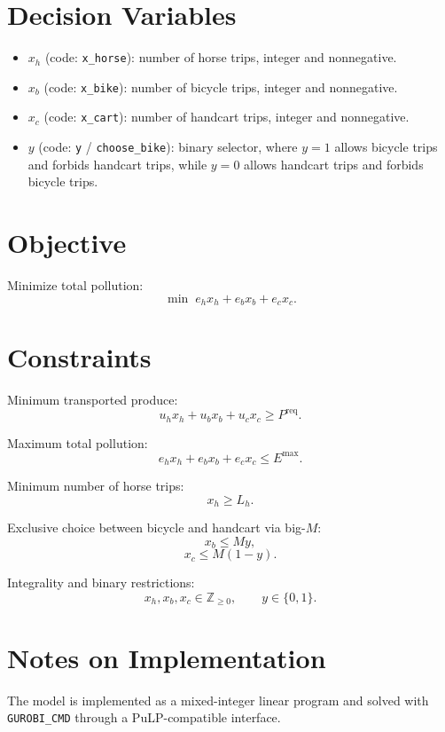 \section*{Decision Variables}

\begin{itemize}
    \item $x_h$ (code: \texttt{x\_horse}): number of horse trips, integer and nonnegative.
    \item $x_b$ (code: \texttt{x\_bike}): number of bicycle trips, integer and nonnegative.
    \item $x_c$ (code: \texttt{x\_cart}): number of handcart trips, integer and nonnegative.
    \item $y$ (code: \texttt{y} / \texttt{choose\_bike}): binary selector, where \(y=1\) allows bicycle trips and forbids handcart trips, while \(y=0\) allows handcart trips and forbids bicycle trips.
\end{itemize}

\section*{Objective}

Minimize total pollution:
\[
\min \; e_h x_h + e_b x_b + e_c x_c.
\]

\section*{Constraints}

Minimum transported produce:
\[
u_h x_h + u_b x_b + u_c x_c \ge P^{\text{req}}.
\]

Maximum total pollution:
\[
e_h x_h + e_b x_b + e_c x_c \le E^{\max}.
\]

Minimum number of horse trips:
\[
x_h \ge L_h.
\]

Exclusive choice between bicycle and handcart via big-\(M\):
\[
x_b \le My,
\]
\[
x_c \le M(1-y).
\]

Integrality and binary restrictions:
\[
x_h, x_b, x_c \in \mathbb{Z}_{\ge 0},
\qquad
y \in \{0,1\}.
\]

\section*{Notes on Implementation}

The model is implemented as a mixed-integer linear program and solved with \texttt{GUROBI\_CMD} through a PuLP-compatible interface.

